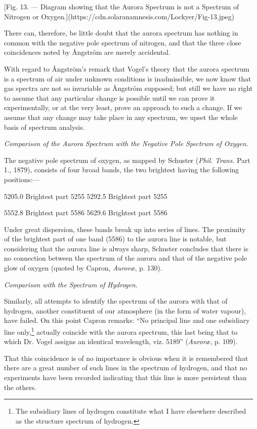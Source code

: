 \documentclass[a4paper, 12pt, oneside, polutonikogreek, english]{article}
\begin{document}
[Fig. 13. --- Diagram showing that the Aurora Spectrum is not a Spectrum of Nitrogen or Oxygen.](https://cdn.solaranamnesis.com/Lockyer/Fig-13.jpeg)

There can, therefore, be little doubt that the aurora spectrum has nothing in common with the negative pole spectrum of nitrogen, and that the three close coincidences noted by Ångström are merely accidental.

With regard to Ångström's remark that Vogel's theory that the aurora spectrum is a spectrum of air under unknown conditions is inadmissible, we now know that gas spectra are not so invariable as Ångström supposed; but still we have no right to assume that any particular change is possible until we can prove it experimentally, or at the very least, prove an approach to such a change. If we assume that any change may take place in any spectrum, we upset the whole basis of spectrum analysis.

\emph{Comparison of the Aurora Spectrum with the Negative Pole Spectrum of Oxygen.}

The negative pole spectrum of oxygen, as mapped by Schuster (\emph{Phil. Trans.} Part 1., 1879), consists of four broad bands, the two brightest having the following positions:---

5205.0 Brightest part 5255 
5292.5 Brightest part 5255

5552.8 Brightest part 5586 
5629.6 Brightest part 5586

Under great dispersion, these bands break up into series of lines. The proximity of the brightest part of one band (5586) to the aurora line is notable, but considering that the aurora line is always sharp, Schuster concludes that there is no connection between the spectrum of the aurora and that of the negative pole glow of oxygen (quoted by Capron, \emph{Auroræ}, p. 130).

\emph{Comparison with the Spectrum of Hydrogen.}

Similarly, all attempts to identify the spectrum of the aurora with that of hydrogen, another constituent of our atmosphere (in the form of water vapour), have failed. On this point Capron remarks: ``No principal line and one subsidiary line only,\footnote{The subsidiary lines of hydrogen constitute what I have elsewhere described as the structure spectrum of hydrogen.} actually coincide with the aurora spectrum, this last being that to which Dr. Vogel assigns an identical wavelength, viz. 5189'' (\emph{Auroræ}, p. 109).

That this coincidence is of no importance is obvious when it is remembered that there are a great number of such lines in the spectrum of hydrogen, and that no experiments have been recorded indicating that this line is more persistent than the others.
\end{document}
